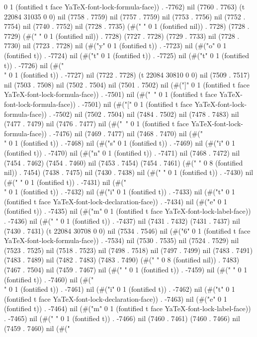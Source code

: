 0 1 (fontified t face YaTeX-font-lock-formula-face)) . -7762) nil (7760 . 7763) (t 22084 31035 0 0) nil (7758 . 7759) nil (7757 . 7759) nil (7753 . 7756) nil (7752 . 7754) nil (7740 . 7752) nil (7728 . 7735) (#(" " 0 1 (fontified nil)) . 7728) (7728 . 7729) (#(" " 0 1 (fontified nil)) . 7728) (7727 . 7728) (7729 . 7733) nil (7728 . 7730) nil (7723 . 7728) nil (#("y" 0 1 (fontified t)) . -7723) nil (#("o" 0 1 (fontified t)) . -7724) nil (#("t" 0 1 (fontified t)) . -7725) nil (#("t" 0 1 (fontified t)) . -7726) nil (#("\\" 0 1 (fontified t)) . -7727) nil (7722 . 7728) (t 22084 30810 0 0) nil (7509 . 7517) nil (7503 . 7508) nil (7502 . 7504) nil (7501 . 7502) nil (#("]" 0 1 (fontified t face YaTeX-font-lock-formula-face)) . -7501) nil (#("~" 0 1 (fontified t face YaTeX-font-lock-formula-face)) . -7501) nil (#("[" 0 1 (fontified t face YaTeX-font-lock-formula-face)) . -7502) nil (7502 . 7504) nil (7484 . 7502) nil (7478 . 7483) nil (7477 . 7479) nil (7476 . 7477) nil (#("~" 0 1 (fontified t face YaTeX-font-lock-formula-face)) . -7476) nil (7469 . 7477) nil (7468 . 7470) nil (#("\\" 0 1 (fontified t)) . -7468) nil (#("s" 0 1 (fontified t)) . -7469) nil (#("i" 0 1 (fontified t)) . -7470) nil (#("n" 0 1 (fontified t)) . -7471) nil (7468 . 7472) nil (7454 . 7462) (7454 . 7460) nil (7453 . 7454) (7454 . 7461) (#("        " 0 8 (fontified nil)) . 7454) (7438 . 7475) nil (7430 . 7438) nil (#("
" 0 1 (fontified t)) . -7430) nil (#(" " 0 1 (fontified t)) . -7431) nil (#("\\" 0 1 (fontified t)) . -7432) nil (#("i" 0 1 (fontified t)) . -7433) nil (#("t" 0 1 (fontified t face YaTeX-font-lock-declaration-face)) . -7434) nil (#("e" 0 1 (fontified t)) . -7435) nil (#("m" 0 1 (fontified t face YaTeX-font-lock-label-face)) . -7436) nil (#(" " 0 1 (fontified t)) . -7437) nil (7431 . 7432) (7431 . 7437) nil (7430 . 7431) (t 22084 30708 0 0) nil (7534 . 7546) nil (#("6" 0 1 (fontified t face YaTeX-font-lock-formula-face)) . -7534) nil (7530 . 7535) nil (7524 . 7529) nil (7523 . 7525) nil (7518 . 7523) nil (7498 . 7518) nil (7497 . 7499) nil (7483 . 7491) (7483 . 7489) nil (7482 . 7483) (7483 . 7490) (#("        " 0 8 (fontified nil)) . 7483) (7467 . 7504) nil (7459 . 7467) nil (#("
" 0 1 (fontified t)) . -7459) nil (#(" " 0 1 (fontified t)) . -7460) nil (#("\\" 0 1 (fontified t)) . -7461) nil (#("i" 0 1 (fontified t)) . -7462) nil (#("t" 0 1 (fontified t face YaTeX-font-lock-declaration-face)) . -7463) nil (#("e" 0 1 (fontified t)) . -7464) nil (#("m" 0 1 (fontified t face YaTeX-font-lock-label-face)) . -7465) nil (#(" " 0 1 (fontified t)) . -7466) nil (7460 . 7461) (7460 . 7466) nil (7459 . 7460) nil (#("
